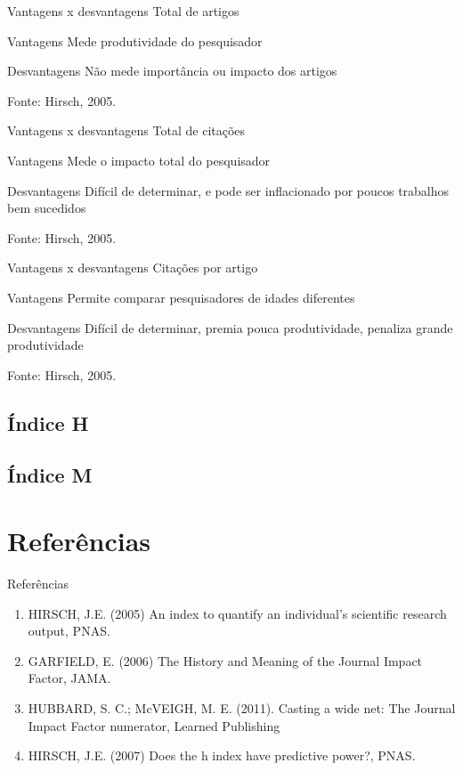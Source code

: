 \documentclass{beamer}
\begin{document}
\begin{frame}{Vantagens x desvantagens}
  Total de artigos
  \begin{block}{Vantagens}
    Mede produtividade do pesquisador
  \end{block}
  \begin{block}{Desvantagens}
    Não mede importância ou impacto dos artigos
  \end{block}

\vfill
Fonte: Hirsch, 2005.
\end{frame}

\begin{frame}{Vantagens x desvantagens}
Total de citações
  \begin{block}{Vantagens}
    Mede o impacto total do pesquisador
  \end{block}
  \begin{block}{Desvantagens}
    Difícil de determinar, e pode ser inflacionado por poucos trabalhos bem sucedidos
  \end{block}

\vfill
Fonte: Hirsch, 2005.
\end{frame}

\begin{frame}{Vantagens x desvantagens}
Citações por artigo
  \begin{block}{Vantagens}
    Permite comparar pesquisadores de idades diferentes
  \end{block}
  \begin{block}{Desvantagens}
    Difícil de determinar, premia pouca produtividade, penaliza grande produtividade
  \end{block}

\vfill
Fonte: Hirsch, 2005.
\end{frame}

\subsection{Índice H}

\subsection{Índice M}

\section{Referências}

\begin{frame}{Referências}
  \begin{enumerate}
  \item<1-> HIRSCH, J.E. (2005) An index to quantify an individual's scientific research output, PNAS.
  \item<1-> GARFIELD, E. (2006) The History and Meaning of the Journal Impact Factor, JAMA.
  \item<1-> HUBBARD, S. C.; McVEIGH, M. E. (2011). Casting a wide net: The Journal Impact Factor numerator, Learned Publishing
  \item<1-> HIRSCH, J.E. (2007) Does the h index have predictive power?, PNAS.
  \end{enumerate}
\end{frame}
\end{document}
